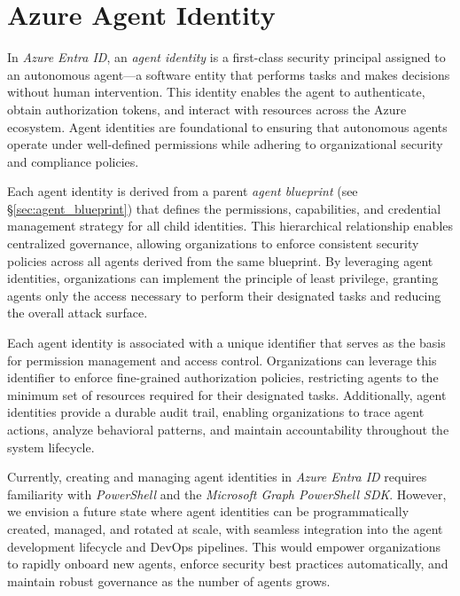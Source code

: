 \documentclass[9pt]{extarticle}%
\begin{document}
\section{Azure Agent Identity}%
In \textit{Azure Entra ID}, an \textit{agent identity} is a first-class security principal assigned to an autonomous agent---a software entity that performs tasks and makes decisions without human intervention. This identity enables the agent to authenticate, obtain authorization tokens, and interact with resources across the Azure ecosystem. Agent identities are foundational to ensuring that autonomous agents operate under well-defined permissions while adhering to organizational security and compliance policies.
%
\par\vspace{\baselineskip}%
Each agent identity is derived from a parent \textit{agent blueprint} (see \S\ref{sec:agent_blueprint}) that defines the permissions, capabilities, and credential management strategy for all child identities. This hierarchical relationship enables centralized governance, allowing organizations to enforce consistent security policies across all agents derived from the same blueprint. By leveraging agent identities, organizations can implement the principle of least privilege, granting agents only the access necessary to perform their designated tasks and reducing the overall attack surface.
%
\par\vspace{\baselineskip}%
Each agent identity is associated with a unique identifier that serves as the basis for permission management and access control. Organizations can leverage this identifier to enforce fine-grained authorization policies, restricting agents to the minimum set of resources required for their designated tasks. Additionally, agent identities provide a durable audit trail, enabling organizations to trace agent actions, analyze behavioral patterns, and maintain accountability throughout the system lifecycle.
%
\par\vspace{\baselineskip}%
Currently, creating and managing agent identities in \textit{Azure Entra ID} requires familiarity with \textit{PowerShell} and the \textit{Microsoft Graph PowerShell SDK}. However, we envision a future state where agent identities can be programmatically created, managed, and rotated at scale, with seamless integration into the agent development lifecycle and DevOps pipelines. This would empower organizations to rapidly onboard new agents, enforce security best practices automatically, and maintain robust governance as the number of agents grows.
%
\par\vspace{\baselineskip}%
\end{document}
